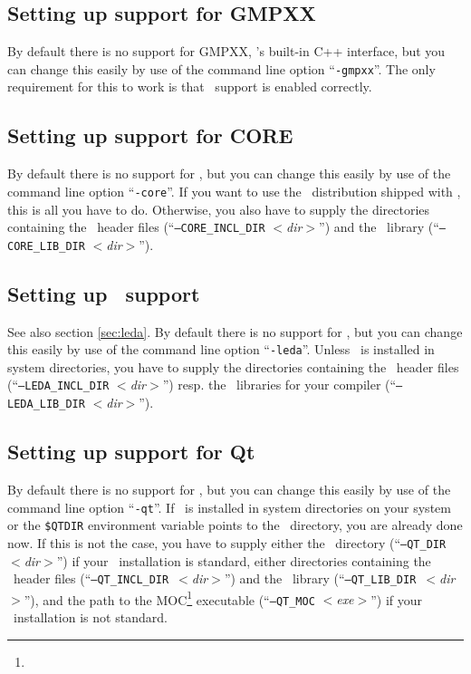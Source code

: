 \subsection{Setting up support for GMPXX}\label{sec:gmpxx-setup}

By default there is no support for GMPXX, \gmp's built-in C++
interface, but you can change this easily by use of the command line
option ``\texttt{-gmpxx}''.  The only requirement for this to work is
that \gmp\ support is enabled correctly.

\subsection{Setting up support for CORE}\label{sec:core-setup}

By default there is no support for \core, but you can change this
easily by use of the command line option ``\texttt{-core}''. If you
want to use the \core\ distribution shipped with \cgal, this is all
you have to do. Otherwise, you also have to supply the directories
containing the \core\ header files (``\texttt{--CORE\_INCL\_DIR}
\textit{$<$dir$>$}'') and the \core\ library
(``\texttt{--CORE\_LIB\_DIR}
\textit{$<$dir$>$}'').

\subsection{Setting up \leda\ support}\label{sec:leda-setup}

See also section \ref{sec:leda}. By default there is no support for
\leda, but you can change this easily by use of the command line
option ``\texttt{-leda}''.  Unless \leda\ is installed in system
directories, you have to supply the directories containing
the \leda\ header files (``\texttt{--LEDA\_INCL\_DIR}
\textit{$<$dir$>$}'') resp. the \leda\ 
libraries for your compiler (``\texttt{--LEDA\_LIB\_DIR} {\it
  $<$dir$>$}'').

\subsection{Setting up support for Qt}\label{sec:qt-setup}

By default there is no support for \qt, but you can change this easily
by use of the command line option ``\texttt{-qt}''. If \qt\ is
installed in system directories on your system or the \texttt{\$QTDIR}
environment variable points to the \qt\ directory, you are already
done now. If this is not the case, you have to supply either the \qt\ 
directory (``\texttt{--QT\_DIR}~\textit{$<$dir$>$}'')
if your \qt\ installation is standard, either directories containing
the \qt\ header files
(``\texttt{--QT\_INCL\_DIR}~\textit{$<$dir$>$}'')
and the \qt\ library
(``\texttt{--QT\_LIB\_DIR}~\textit{$<$dir$>$}'')\TTindex{QT\_LIB\_DIR},
and the path to the MOC\footnote{\qtmocpage} executable
(``\texttt{--QT\_MOC} \textit{$<$exe$>$}'')\TTindex{QT\_MOC} if your
\qt\ installation is not standard.

